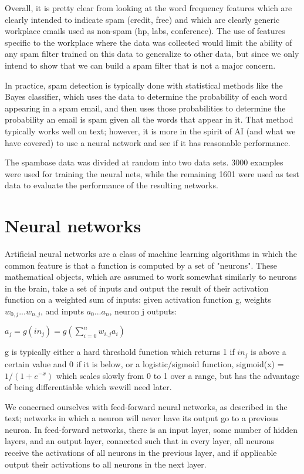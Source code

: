 \documentclass[11pt]{article} %
\begin{document}
Overall, it is pretty clear from looking at the word frequency features which are clearly intended to indicate spam (credit, free) and which are clearly generic workplace emails used as non-spam (hp, labs, conference). The use of features specific to the workplace where the data was collected would limit the ability of any spam filter trained on this data to generalize to other data, but since we only intend to show that we can build a spam filter that is not a major concern.

In practice, spam detection is typically done with statistical methods like the Bayes classifier, which uses the data to determine the probability of each word appearing in a spam email, and then uses those probabilities to determine the probability an email is spam given all the words that appear in it. That method typically works well on text; however, it is more in the spirit of AI (and what we have covered) to use a neural network and see if it has reasonable performance.

The spambase data was divided at random into two data sets. 3000 examples were used for training the neural nets, while the remaining 1601 were used as test data to evaluate the performance of the resulting networks.

\section{Neural networks}

Artificial neural networks are a class of machine learning algorithms in which the common feature is that a function is computed by a set of "neurons". These mathematical objects, which are assumed to work somewhat similarly to neurons in the brain, take a set of inputs and output the result of their activation function on a weighted sum of inputs: given activation function g, weights $w_{0,j} ... w_{n,j}$, and inputs $a_0...a_n$, neuron j outputs:

$a_j = g(in_j) = g(\sum_{i=0}^n w_{i,j}a_i)$

g is typically either a hard threshold function which returns 1 if $in_j$ is above a certain value and 0 if it is below, or a logistic/sigmoid function, sigmoid(x) = $1/(1+e^{-x})$ which scales slowly from 0 to 1 over a range, but has the advantage of being differentiable which wewill need later.

We concerned ourselves with feed-forward neural networks, as described in the text; networks in which a neuron will never have its output go to a previous neuron. In feed-forward networks, there is an input layer, some number of hidden layers, and an output layer, connected such that in every layer, all neurons receive the activations of all neurons in the previous layer, and if applicable output their activations to all neurons in the next layer.
\end{document}
